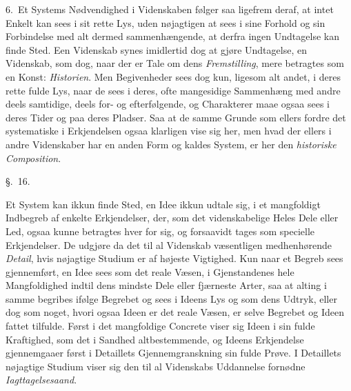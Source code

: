 \documentclass[12pt,a4paper]{book}
\newcommand{\apage}[1]{\marginnote{\footnotesize\textit{[#1]}}}
\begin{document}
6.~Et Systems Nødvendighed i Videnskaben følger saa ligefrem deraf, at intet
Enkelt kan sees i sit rette Lys, uden nøjagtigen at sees i sine Forhold og sin
Forbindelse med alt dermed sammenhængende, at derfra ingen Undtagelse kan finde
Sted. Een Videnskab synes imidlertid dog at gjøre Undtagelse, en Videnskab, som
dog, naar der er Tale om dens \emph{Fremstilling}, mere betragtes som en Konst:
\emph{Historien}. Men Begivenheder sees dog kun, ligesom alt andet, i deres rette
fulde Lys, naar de sees i deres, ofte mangesidige Sammenhæng med andre deels
samtidige, deels for- og efterfølgende, og Charakterer maae ogsaa sees i deres
Tider og paa deres Pladser. Saa at de samme Grunde som ellers fordre det
systematiske i Erkjendelsen ogsaa klarligen vise sig her, men hvad der ellers i
andre Videnskaber har en anden Form og kaldes System, er her den \emph{historiske
Composition}.

\begin{center}\large\S.~16.\end{center} \apage{146} 

Et System kan ikkun finde Sted, en Idee ikkun udtale sig, i et mangfoldigt
Indbegreb af enkelte Erkjendelser, der, som det videnskabelige Heles Dele eller
Led, ogsaa kunne betragtes hver for sig, og forsaavidt tages som specielle
Erkjendelser. De udgjøre da det til al Videnskab væsentligen medhenhørende
\emph{Detail}, hvis nøjagtige Studium er af højeste Vigtighed. Kun naar et Begreb
sees gjennemført, en Idee sees som det reale Væsen, i Gjenstandenes hele
Mangfoldighed indtil dens mindste Dele eller fjærneste Arter, saa at alting i samme
begribes ifølge Begrebet og sees i Ideens Lys og som dens Udtryk, eller dog som
noget, hvori ogsaa Ideen er det reale Væsen, er selve Begrebet og Ideen fattet
tilfulde. Først i det mangfoldige Concrete viser sig Ideen i sin fulde Kraftighed,
som det i Sandhed altbestemmende, og Ideens Erkjendelse gjennemgaaer først i
Detaillets Gjennemgranskning sin fulde Prøve. I Detaillets nøjagtige Studium viser
sig den til al Videnskabs Uddannelse fornødne \emph{Iagttagelsesaand}.
\end{document}
